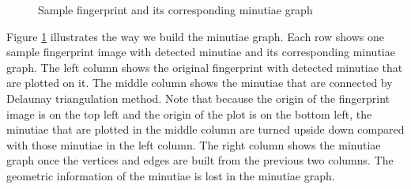 \begin{figure}[!ht]
\begin{minipage}[b]{0.93\linewidth}
{\begin{minipage}[b]{0.27\linewidth}
            \end{minipage}
        }
    \end{minipage}
    \vfill
    \caption{Sample fingerprint and its corresponding minutiae graph}
    \label{fig:mnt}
\end{figure}

Figure \ref{fig:mnt} illustrates the way we build the minutiae graph. Each row shows one sample fingerprint image with detected minutiae and its corresponding minutiae graph. The left column shows the original fingerprint with detected minutiae that are plotted on it. The middle column shows the minutiae that are connected by Delaunay triangulation method. Note that because the origin of the fingerprint image is on the top left and the origin of the plot is on the bottom left, the minutiae that are plotted in the middle column are turned upside down compared with those minutiae in the left column. The right column shows the minutiae graph once the vertices and edges are built from the previous two columns. The geometric information of the minutiae is lost in the minutiae graph.